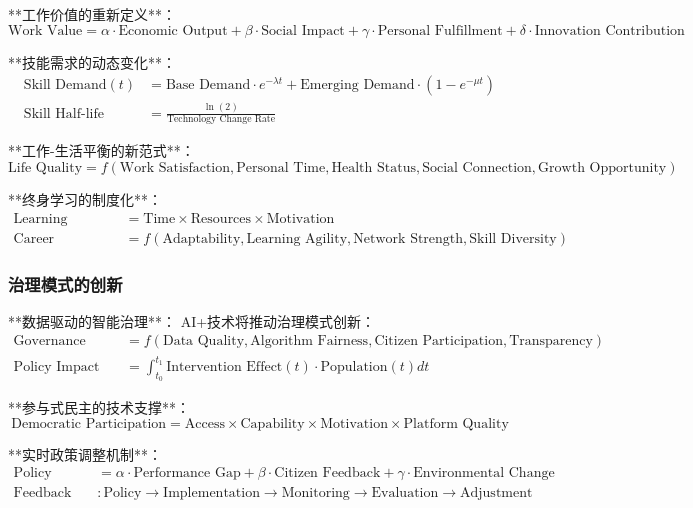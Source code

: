 **工作价值的重新定义**：
\begin{equation}
\text{Work Value} = \alpha \cdot \text{Economic Output} + \beta \cdot \text{Social Impact} + \gamma \cdot \text{Personal Fulfillment} + \delta \cdot \text{Innovation Contribution}
\end{equation}

**技能需求的动态变化**：
\begin{align}
\text{Skill Demand}(t) &= \text{Base Demand} \cdot e^{-\lambda t} + \text{Emerging Demand} \cdot (1 - e^{-\mu t}) \\
\text{Skill Half-life} &= \frac{\ln(2)}{\text{Technology Change Rate}}
\end{align}

**工作-生活平衡的新范式**：
\begin{equation}
\text{Life Quality} = f(\text{Work Satisfaction}, \text{Personal Time}, \text{Health Status}, \text{Social Connection}, \text{Growth Opportunity})
\end{equation}

**终身学习的制度化**：
\begin{align}
\text{Learning Investment} &= \text{Time} \times \text{Resources} \times \text{Motivation} \\
\text{Career Resilience} &= f(\text{Adaptability}, \text{Learning Agility}, \text{Network Strength}, \text{Skill Diversity})
\end{align}

\subsubsection{治理模式的创新} %

**数据驱动的智能治理**：
AI+技术将推动治理模式创新：
\begin{align}
\text{Governance Effectiveness} &= f(\text{Data Quality}, \text{Algorithm Fairness}, \text{Citizen Participation}, \text{Transparency}) \\
\text{Policy Impact} &= \int_{t_0}^{t_1} \text{Intervention Effect}(t) \cdot \text{Population}(t) dt
\end{align}

**参与式民主的技术支撑**：
\begin{equation}
\text{Democratic Participation} = \text{Access} \times \text{Capability} \times \text{Motivation} \times \text{Platform Quality}
\end{equation}

**实时政策调整机制**：
\begin{align}
\text{Policy Adjustment} &= \alpha \cdot \text{Performance Gap} + \beta \cdot \text{Citizen Feedback} + \gamma \cdot \text{Environmental Change} \\
\text{Feedback Loop} &: \text{Policy} \to \text{Implementation} \to \text{Monitoring} \to \text{Evaluation} \to \text{Adjustment}
\end{align}

